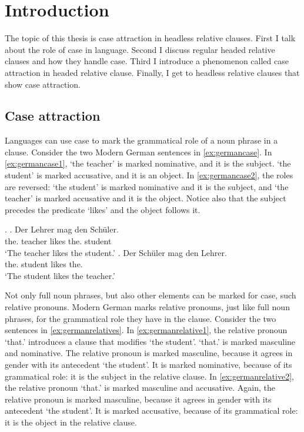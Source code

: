 
\chapter{Introduction}

The topic of this thesis is case attraction in headless relative clauses. First I talk about the role of case in language. Second I discuss regular headed relative clauses and how they handle case. Third I introduce a phenomenon called case attraction in headed relative clause. Finally, I get to headless relative clauses that show case attraction.

\section{Case attraction}

Languages can use case to mark the grammatical role of a noun phrase in a clause. Consider the two Modern German sentences in \ref{ex:germancase}. In \ref{ex:germancase1},  `the teacher' is marked nominative, and it is the subject.  `the student' is marked accusative, and it is an object. In \ref{ex:germancase2}, the roles are reversed:  `the student' is marked nominative and it is the subject, and  `the teacher' is marked accusative and it is the object. Notice also that the subject precedes the predicate  `likes' and the object follows it.

\ex.\label{ex:germancase}
\ag. Der Lehrer mag den Schüler.\\
 the. teacher likes the. student\\
 `The teacher likes the student.'\label{ex:germancase1}
\bg. Der Schüler mag den Lehrer.\\
 the. student likes the.\\
 `The student likes the teacher.'\label{ex:germancase2}

Not only full noun phrases, but also other elements can be marked for case, such relative pronouns. Modern German marks relative pronouns, just like full noun phrases, for the grammatical role they have in the clause. Consider the two sentences in \ref{ex:germanrelatives}. In \ref{ex:germanrelative1}, the relative pronoun  `that.' introduces a clause that modifies  `the student'.  `that.' is marked masculine and nominative. The relative pronoun is marked masculine, because it agrees in gender with its antecedent  `the student'. It is marked nominative, because of its grammatical role: it is the subject in the relative clause.
In \ref{ex:germanrelative2}, the relative pronoun  `that.' is marked masculine and accusative. Again, the relative pronoun is marked masculine, because it agrees in gender with its antecedent  `the student'. It is marked accusative, because of its grammatical role: it is the object in the relative clause.

